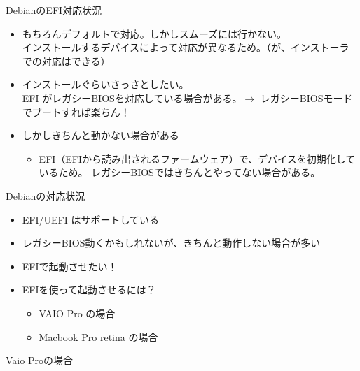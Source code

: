 
\begin{frame}[containsverbatim]{DebianのEFI対応状況}

\begin{itemize}
\item もちろんデフォルトで対応。しかしスムーズには行かない。\\
インストールするデバイスによって対応が異なるため。（が、インストーラでの対応はできる）
\item インストールぐらいさっさとしたい。\\
EFI がレガシーBIOSを対応している場合がある。$\rightarrow$
レガシーBIOSモードでブートすれば楽ちん！
\item しかしきちんと動かない場合がある
\begin{itemize}
\item EFI（EFIから読み出されるファームウェア）で、デバイスを初期化しているため。
レガシーBIOSではきちんとやってない場合がある。
\end{itemize}
\end{itemize}

\end{frame}

\begin{frame}[containsverbatim]{Debianの対応状況}
\begin{itemize}
\item EFI/UEFI はサポートしている
\item レガシーBIOS動くかもしれないが、きちんと動作しない場合が多い
\item EFIで起動させたい！
\item EFIを使って起動させるには？
\begin{itemize}
\item VAIO Pro の場合
\item Macbook Pro retina の場合
\end{itemize}
\end{itemize}

\end{frame}

\begin{frame}[containsverbatim]{Vaio Proの場合}
\end{frame}

